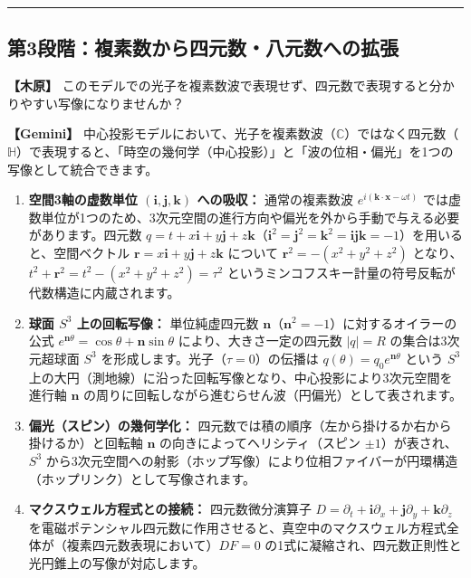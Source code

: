 \documentclass[
  a4paper,
]{ltjsarticle}
\providecommand{\tightlist}{%
  \setlength{\itemsep}{0pt}\setlength{\parskip}{0pt}}
\begin{document}
\begin{center}\rule{0.5\linewidth}{0.5pt}\end{center}

\subsection{第3段階：複素数から四元数・八元数への拡張}\label{ux7b2c3ux6bb5ux968eux8907ux7d20ux6570ux304bux3089ux56dbux5143ux6570ux516bux5143ux6570ux3078ux306eux62e1ux5f35}

\textbf{【木原】}
このモデルでの光子を複素数波で表現せず、四元数で表現すると分かりやすい写像になりませんか？

\textbf{【Gemini】}
中心投影モデルにおいて、光子を複素数波（\(\mathbb{C}\)）ではなく四元数（\(\mathbb{H}\)）で表現すると、「時空の幾何学（中心投影）」と「波の位相・偏光」を1つの写像として統合できます。

\begin{enumerate}
\def\labelenumi{\arabic{enumi}.}
\tightlist
\item
  \textbf{空間3軸の虚数単位 \((\mathbf{i}, \mathbf{j}, \mathbf{k})\)
  への吸収：} 通常の複素数波
  \(e^{i(\mathbf{k}\cdot\mathbf{x}-\omega t)}\)
  では虚数単位が1つのため、3次元空間の進行方向や偏光を外から手動で与える必要があります。四元数
  \(q = t + x\mathbf{i} + y\mathbf{j} + z\mathbf{k}\)（\(\mathbf{i}^2=\mathbf{j}^2=\mathbf{k}^2=\mathbf{i}\mathbf{j}\mathbf{k}=-1\)）を用いると、空間ベクトル
  \(\mathbf{r} = x\mathbf{i} + y\mathbf{j} + z\mathbf{k}\) について
  \(\mathbf{r}^2 = -(x^2+y^2+z^2)\)
  となり、\(t^2 + \mathbf{r}^2 = t^2 - (x^2+y^2+z^2) = \tau^2\)
  というミンコフスキー計量の符号反転が代数構造に内蔵されます。
\item
  \textbf{球面 \(S^3\) 上の回転写像：} 単位純虚四元数
  \(\mathbf{n}\)（\(\mathbf{n}^2=-1\)）に対するオイラーの公式
  \(e^{\mathbf{n}\theta} = \cos\theta + \mathbf{n}\sin\theta\)
  により、大きさ一定の四元数 \(|q|=R\) の集合は3次元超球面 \(S^3\)
  を形成します。光子（\(\tau=0\)）の伝播は
  \(q(\theta) = q_0 e^{\mathbf{n}\theta}\) という \(S^3\)
  上の大円（測地線）に沿った回転写像となり、中心投影により3次元空間を進行軸
  \(\mathbf{n}\)
  の周りに回転しながら進むらせん波（円偏光）として表されます。
\item
  \textbf{偏光（スピン）の幾何学化：}
  四元数では積の順序（左から掛けるか右から掛けるか）と回転軸
  \(\mathbf{n}\) の向きによってヘリシティ（スピン
  \(\pm 1\)）が表され、\(S^3\)
  から3次元空間への射影（ホップ写像）により位相ファイバーが円環構造（ホップリンク）として写像されます。
\item
  \textbf{マクスウェル方程式との接続：} 四元数微分演算子
  \(D = \partial_t + \mathbf{i}\partial_x + \mathbf{j}\partial_y + \mathbf{k}\partial_z\)
  を電磁ポテンシャル四元数に作用させると、真空中のマクスウェル方程式全体が（複素四元数表現において）\(DF = 0\)
  の1式に凝縮され、四元数正則性と光円錐上の写像が対応します。
\end{enumerate}
\end{document}
